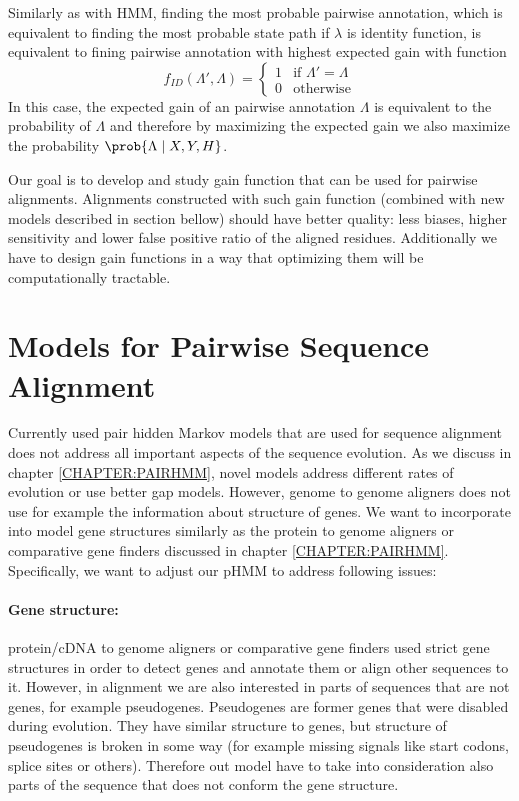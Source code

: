 Similarly as with HMM, finding the most probable pairwise annotation, which is equivalent
to finding the most probable state path if $\lambda$ is identity function,
is equivalent to fining pairwise annotation with highest expected gain with
function
\[f_{ID}(\Lambda',\Lambda) = \begin{cases}
1 & \text{if $\Lambda'=\Lambda$}\\
0 & \text{otherwise}
\end{cases}\]
In this case, the expected gain of an pairwise annotation $\Lambda$ is
equivalent to the probability of $\Lambda$ and therefore by maximizing the
expected gain we also maximize the probability $\prob{\Lambda\mid X,Y,H}$.


Our goal is to develop and study gain function that can be used for pairwise
alignments. Alignments constructed with such gain function (combined with new
models described in section bellow) should have better quality: less biases,
higher sensitivity and lower false positive ratio of the aligned residues.
Additionally we have to design gain functions in a way that optimizing them will
be computationally tractable.

\section{Models for Pairwise Sequence Alignment}

Currently used pair hidden Markov models that are used for sequence alignment
does not address all important aspects of the sequence evolution. As we discuss
in chapter \ref{CHAPTER:PAIRHMM}, novel models address different rates of
evolution or use better gap models. However, genome to genome aligners does not
use for example the information about structure of genes. We want to incorporate
into model gene structures similarly as the protein to genome aligners or
comparative gene finders discussed in chapter \ref{CHAPTER:PAIRHMM}.
Specifically, we want to adjust our pHMM to  address following issues: 

\paragraph{Gene structure:}  protein/cDNA to genome aligners or comparative gene
finders used strict gene structures in order to detect genes and annotate them
or align other sequences to it.  However, in alignment we are also interested in
parts of sequences that are not genes, for example pseudogenes. Pseudogenes are
former genes that were disabled during evolution. They have similar structure to
genes, but structure of pseudogenes is broken in some way (for example missing
signals like start codons, splice sites or others). Therefore out model have to
take into consideration also parts of the sequence that does not conform the
gene structure.

